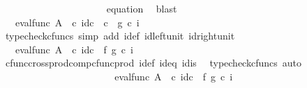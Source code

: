 \begin{isabellebody}
\ \ \ \ \ \ \ \ \ \ \ \ \ \ \ \ \ \ \ \ \isamarkupfalse%
\ equation{}\ \isamarkupfalse%
\ blast\isanewline
\ \ \ \ \ \ \ \ \ \ \ \ \ \ \ \ \ \ \isamarkupfalse%
\ \isamarkupfalse%
\ {\isachardoublequoteopen}{\isachardot}{\kern0pt}{\isachardot}{\kern0pt}{\isachardot}{\kern0pt}\ {\isacharequal}{\kern0pt}\ eval{\isacharunderscore}{\kern0pt}func\ A\ {\isasymOmega}\ {\isasymcirc}\isactrlsub c\ {\isasymlangle}id\isactrlsub c\ {\isasymOmega}\ {\isasymcirc}\isactrlsub c\ \ {\isasymf}{\isacharcomma}{\kern0pt}g\ {\isasymcirc}\isactrlsub c\ i{\isasymrangle}{\isachardoublequoteclose}\isanewline
\ \ \ \ \ \ \ \ \ \ \ \ \ \ \ \ \ \ \ \ \isamarkupfalse%
\ {\isacharparenleft}{\kern0pt}typecheck{\isacharunderscore}{\kern0pt}cfuncs{\isacharcomma}{\kern0pt}\ simp\ add{\isacharcolon}{\kern0pt}\ i{\isacharunderscore}{\kern0pt}def\ id{\isacharunderscore}{\kern0pt}left{\isacharunderscore}{\kern0pt}unit{}\ id{\isacharunderscore}{\kern0pt}right{\isacharunderscore}{\kern0pt}unit{}{\isacharparenright}{\kern0pt}\isanewline
\ \ \ \ \ \ \ \ \ \ \ \ \ \ \ \ \ \ \isamarkupfalse%
\ \isamarkupfalse%
\ {\isachardoublequoteopen}{\isachardot}{\kern0pt}{\isachardot}{\kern0pt}{\isachardot}{\kern0pt}\ {\isacharequal}{\kern0pt}\ eval{\isacharunderscore}{\kern0pt}func\ A\ {\isasymOmega}\ {\isasymcirc}\isactrlsub c\ {\isacharparenleft}{\kern0pt}{\isacharparenleft}{\kern0pt}id\isactrlsub c\ {\isasymOmega}\ {\isasymtimes}\isactrlsub f\ g{\isacharparenright}{\kern0pt}\ {\isasymcirc}\isactrlsub c\ {\isasymlangle}{\isasymf}{\isacharcomma}{\kern0pt}i{\isasymrangle}{\isacharparenright}{\kern0pt}{\isachardoublequoteclose}\isanewline
\ \ \ \ \ \ \ \ \ \ \ \ \ \ \ \ \ \ \ \ \isamarkupfalse%
\ cfunc{\isacharunderscore}{\kern0pt}cross{\isacharunderscore}{\kern0pt}prod{\isacharunderscore}{\kern0pt}comp{\isacharunderscore}{\kern0pt}cfunc{\isacharunderscore}{\kern0pt}prod\ i{\isacharunderscore}{\kern0pt}def\ id{}{\isacharunderscore}{\kern0pt}eq\ id{}{\isacharunderscore}{\kern0pt}is\ \isamarkupfalse%
\ {\isacharparenleft}{\kern0pt}typecheck{\isacharunderscore}{\kern0pt}cfuncs{\isacharcomma}{\kern0pt}\ auto{\isacharparenright}{\kern0pt}\isanewline
\ \ \ \ \ \ \ \ \ \ \ \ \ \ \ \ \ \ \isamarkupfalse%
\ \isamarkupfalse%
\ {\isachardoublequoteopen}{\isachardot}{\kern0pt}{\isachardot}{\kern0pt}{\isachardot}{\kern0pt}\ {\isacharequal}{\kern0pt}\ {\isacharparenleft}{\kern0pt}eval{\isacharunderscore}{\kern0pt}func\ A\ {\isasymOmega}\ {\isasymcirc}\isactrlsub c\ {\isacharparenleft}{\kern0pt}id\isactrlsub c\ {\isasymOmega}\ {\isasymtimes}\isactrlsub f\ g{\isacharparenright}{\kern0pt}{\isacharparenright}{\kern0pt}\ {\isasymcirc}\isactrlsub c\ {\isasymlangle}{\isasymf}{\isacharcomma}{\kern0pt}i{\isasymrangle}{\isachardoublequoteclose}\isanewline

\end{isabellebody}
